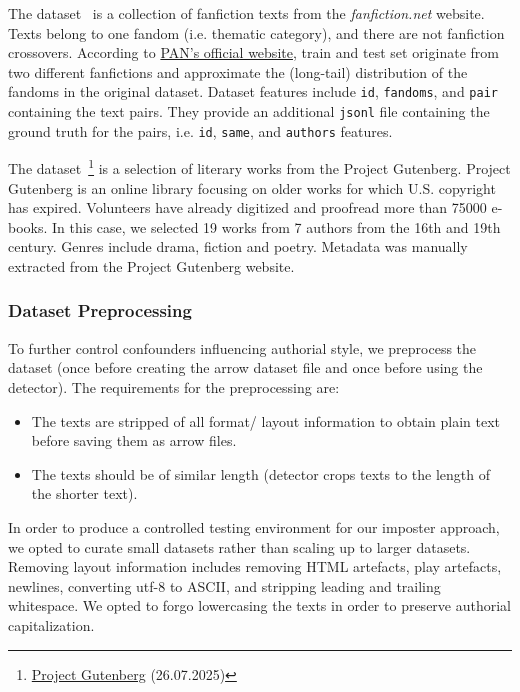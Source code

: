 The \dataPan{} dataset~\citep{bischoff_importance_2020} is a collection of fanfiction texts from the \textit{fanfiction.net} website.
Texts belong to one fandom (i.e. thematic category), and there are not fanfiction crossovers.
According to \href{https://pan.webis.de/clef20/pan20-web/author-identification.html}{PAN's official website}, 
train and test set originate from two different fanfictions and approximate the (long-tail) distribution of the fandoms in the original dataset.
Dataset features include \texttt{id}, \texttt{fandoms}, and \texttt{pair} containing the text pairs.
They provide an additional \texttt{jsonl} file containing the ground truth for the pairs, 
i.e. \texttt{id}, \texttt{same}, and \texttt{authors} features.

The \dataGutenberg{} dataset~\footnote{\href{https://www.gutenberg.org/}{Project Gutenberg} (26.07.2025)} 
is a selection of literary works from the Project Gutenberg.
Project Gutenberg is an online library focusing on older works for which U.S. copyright has expired.
Volunteers have already digitized and proofread more than \num{75000} e-books.
In this case, we selected 19 works from 7 authors from the 16th and 19th century.
Genres include drama, fiction and poetry.
Metadata was manually extracted from the Project Gutenberg website.


\subsubsection{Dataset Preprocessing}
\label{subsubsec:dataset_preprocessing}

To further control confounders influencing authorial style, we preprocess the dataset 
(once before creating the arrow dataset file and once before using the detector).
The requirements for the preprocessing are:
\begin{itemize}
    \item The texts are stripped of all format/ layout information to obtain plain text before saving them as arrow files.
    \item The texts should be of similar length (detector crops texts to the length of the shorter text).
\end{itemize}
In order to produce a controlled testing environment for our imposter approach, 
we opted to curate small datasets rather than scaling up to larger datasets.
Removing layout information includes removing HTML artefacts, play artefacts, newlines, 
converting utf-8 to ASCII, and stripping leading and trailing whitespace.
We opted to forgo lowercasing the texts in order to preserve authorial capitalization.


